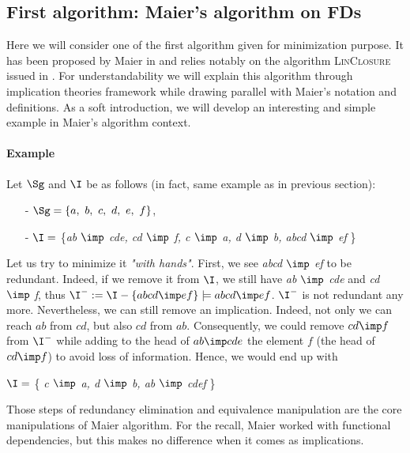 \subsection{First algorithm: Maier's algorithm on FDs}

Here we will consider one of the first algorithm given for minimization 
purpose. It has been proposed by Maier in \cite{maier_theory_1983, 
maier_minimum_1980} and relies notably on the algorithm \textsc{LinClosure} issued in \cite{beeri_computational_1979}. For understandability we will explain this algorithm through implication theories framework while drawing parallel with Maier's notation and definitions. As a soft introduction, we will develop an interesting and simple example in Maier's algorithm context.


\paragraph{Example} Let $\Sg$ and $\I$ be as follows (in fact, same example as 
in previous section):
\begin{itemize}
	\item[-] $\Sg = \{a, \ b, \ c, \ d, \ e, \ f \}$,
	\item[-] $\I =$ \{\textit{ab $\imp$ cde, cd $\imp$ f, c $\imp$ a, d $\imp$ b, abcd $\imp$ ef} \} 
\end{itemize}
\noindent Let us try to minimize it \textit{"with hands"}. First, we see \textit{abcd $\imp$ ef} to be redundant. Indeed, if we remove it from $\I$, we still have \textit{ab $\imp$ cde} and \textit{cd $\imp$ f}, thus $\I^{-} := \I - \{ abcd \imp ef \} \models abcd \imp ef$. $\I^{-}$ is not redundant any more. 
Nevertheless, we can still remove an implication. Indeed, not only we can reach 
$ab$ from $cd$, but also $cd$ from $ab$. Consequently, we could remove $cd \imp 
f$ from $\I^{-}$ while adding to the head of $ab \imp cde$ the element
$f$ (the head of $cd \imp f$) to avoid loss of information. Hence, we 
would end up with 
\begin{center}
	$\I =$ \{ \textit{c $\imp$ a, d $\imp$ b, ab $\imp$ cdef} \}
\end{center}

\vspace{1.2em}

Those steps of redundancy elimination and equivalence manipulation are the core 
manipulations of Maier algorithm. For the recall, Maier worked with functional
dependencies, but this makes no difference when it comes as implications. 

